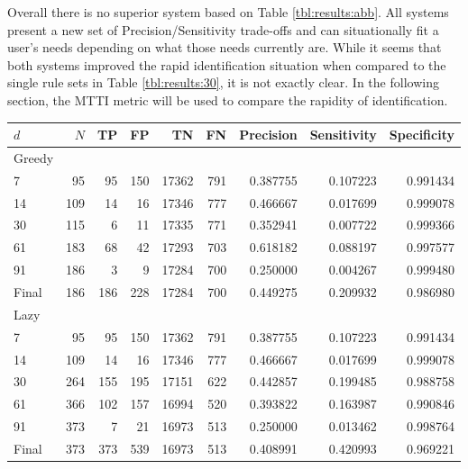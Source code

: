Overall there is no superior system based on Table \ref{tbl:results:abb}. All systems present a new set of Precision/Sensitivity trade-offs and can situationally fit a user's needs depending on what those needs currently are. While it seems that both systems improved the rapid identification situation when compared to the single rule sets in Table \ref{tbl:results:30}, it is not exactly clear. In the following section, the MTTI metric will be used to compare the rapidity of identification.

\begin{table}[h]
	\centering

	\begin{tabular}{lrrrrrrrr}
	\toprule
	{$d$} &    $N$ &   TP &   FP &     TN &   FN &  Precision &  Sensitivity &  Specificity \\
	\midrule
	\toprule
	Greedy & & & & & & & & \\
	\midrule
	7     &   95 &   95 &  150 &  17362 &  791 &    0.387755 &     0.107223 &     0.991434 \\
	14    &  109 &   14 &   16 &  17346 &  777 &    0.466667 &     0.017699 &     0.999078 \\
	30    &  115 &    6 &   11 &  17335 &  771 &    0.352941 &     0.007722 &     0.999366 \\
	61    &  183 &   68 &   42 &  17293 &  703 &    0.618182 &     0.088197 &     0.997577 \\
	91    &  186 &    3 &    9 &  17284 &  700 &    0.250000 &     0.004267 &     0.999480 \\
	Final &  186 &  186 &  228 &  17284 &  700 &    0.449275 &     0.209932 &     0.986980 \\
	\bottomrule
	\toprule
	Lazy & & & & & & & & \\
	\midrule
	7     &   95 &   95 &  150 &  17362 &  791 &    0.387755 &     0.107223 &     0.991434 \\
	14    &  109 &   14 &   16 &  17346 &  777 &    0.466667 &     0.017699 &     0.999078 \\
	30    &  264 &  155 &  195 &  17151 &  622 &    0.442857 &     0.199485 &     0.988758 \\
	61    &  366 &  102 &  157 &  16994 &  520 &    0.393822 &     0.163987 &     0.990846 \\
	91    &  373 &    7 &   21 &  16973 &  513 &    0.250000 &     0.013462 &     0.998764 \\
	Final &  373 &  373 &  539 &  16973 &  513 &    0.408991 &     0.420993 &     0.969221 \\

\end{tabular}
\end{table}

